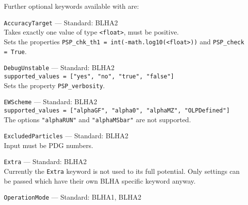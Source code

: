 Further optional keywords available with \gosam are:
\begin{basedescript}{\desclabelstyle{\pushlabel}}
    \item[\hspace{-1em}]\colorbox{gray!30}{\lstinline[style=in]|AccuracyTarget|} --- Standard: BLHA2\vspace{0.1cm}\\
        Takes exactly one value of type \texttt{<float>}, must be positive.\\
        Sets the properties \lstinline[style=in]|PSP_chk_th1 = int(-math.log10(<float>))| and  \lstinline[style=in]|PSP_check = True|.
    \item[\hspace{-1em}]\colorbox{gray!30}{\lstinline[style=in]|DebugUnstable|} --- Standard: BLHA2\vspace{0.1cm}\\
        \lstinline[style=in]|supported_values = ["yes", "no", "true", "false"]|\\
        Sets the property \texttt{PSP\_verbosity}.
    \item[\hspace{-1em}]\colorbox{gray!30}{\lstinline[style=in]|EWScheme|} --- Standard: BLHA2\vspace{0.1cm}\\
        \lstinline[style=in]|supported_values = ["alphaGF", "alpha0", "alphaMZ", "OLPDefined"]|\\
        The options \texttt{"alphaRUN"} and \texttt{"alphaMSbar"} are not supported.
    \item[\hspace{-1em}]\colorbox{gray!30}{\lstinline[style=in]|ExcludedParticles|} --- Standard: BLHA2\vspace{0.1cm}\\
        Input must be PDG numbers.
    \item[\hspace{-1em}]\colorbox{gray!30}{\lstinline[style=in]|Extra|} --- Standard: BLHA2\vspace{0.1cm}\\
        Currently the \texttt{Extra} keyword is not used to its full potential. Only settings can be passed which have their own BLHA specific keyword anyway.
    \item[\hspace{-1em}]\colorbox{gray!30}{\lstinline[style=in]|OperationMode|} --- Standard: BLHA1, BLHA2\vspace{0.1cm}\\

\end{basedescript}

